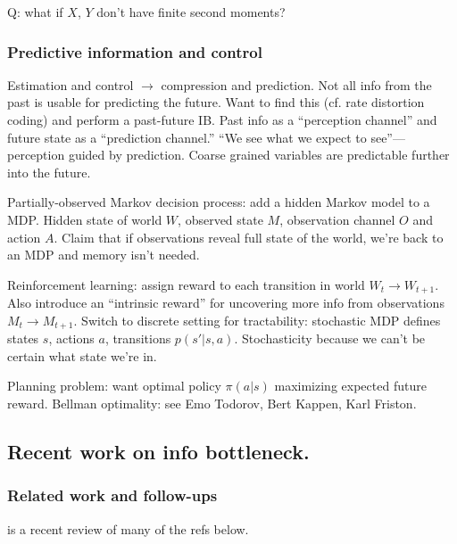 \documentclass[notitlepage,openany,11pt]{report}
\numberwithin{equation}{section}
\theoremstyle{plain}%
\begin{document}
Q: what if $X$, $Y$ don't have finite second moments?

\subsubsection{Predictive information and control} Estimation and control $\rightarrow$ compression and prediction. Not all info from the past is usable for predicting the future. Want to find this (cf. rate distortion coding) and perform a past-future IB. Past info as a ``perception channel'' and future state as a ``prediction channel.'' ``We see what we expect to see''--- perception guided by prediction. Coarse grained variables are predictable further into the future.

Partially-observed Markov decision process: add a hidden Markov model to a MDP. Hidden state of world $W$, observed state $M$, observation channel $O$ and action $A$. Claim that if observations reveal full state of the world, we're back to an MDP and memory isn't needed. 

Reinforcement learning: assign reward to each transition in world $W_{t} \rightarrow W_{t+1}$. Also introduce an ``intrinsic reward'' for uncovering more info from observations $M_{t} \rightarrow M_{t+1}$. Switch to discrete setting for tractability: stochastic MDP defines states $s$, actions $a$, transitions $p(s'|s,a)$. Stochasticity because we can't be certain what state we're in. 

Planning problem: want optimal policy $\pi(a|s)$ maximizing expected future reward. Bellman optimality: see Emo Todorov, Bert Kappen, Karl Friston. 


\subsection{Recent work on info bottleneck.}


\subsubsection{Related work and follow-ups}

\cite{GoldfeldPolyanskiy:20} is a recent review of many of the refs below.
\end{document}
